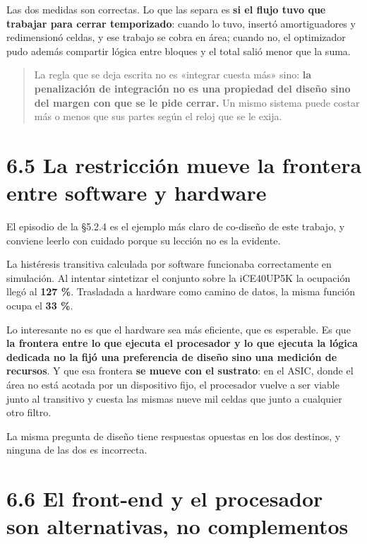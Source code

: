 Las dos medidas son correctas. Lo que las separa es \textbf{si el flujo
tuvo que trabajar para cerrar temporizado}: cuando lo tuvo, insertó
amortiguadores y redimensionó celdas, y ese trabajo se cobra en área;
cuando no, el optimizador pudo además compartir lógica entre bloques y
el total salió menor que la suma.

\begin{quote}
La regla que se deja escrita no es «integrar cuesta más» sino:
\textbf{la penalización de integración no es una propiedad del diseño
sino del margen con que se le pide cerrar.} Un mismo sistema puede
costar más o menos que sus partes según el reloj que se le exija.
\end{quote}

\section{6.5 La restricción mueve la frontera entre software y
hardware}\label{la-restricciuxf3n-mueve-la-frontera-entre-software-y-hardware}

El episodio de la §5.2.4 es el ejemplo más claro de co-diseño de este
trabajo, y conviene leerlo con cuidado porque su lección no es la
evidente.

La histéresis transitiva calculada por software funcionaba correctamente
en simulación. Al intentar sintetizar el conjunto sobre la iCE40UP5K la
ocupación llegó al \textbf{127 \%}. Trasladada a hardware como camino de
datos, la misma función ocupa el \textbf{33 \%}.

Lo interesante no es que el hardware sea más eficiente, que es
esperable. Es que \textbf{la frontera entre lo que ejecuta el procesador
y lo que ejecuta la lógica dedicada no la fijó una preferencia de diseño
sino una medición de recursos}. Y que esa frontera \textbf{se mueve con
el sustrato}: en el ASIC, donde el área no está acotada por un
dispositivo fijo, el procesador vuelve a ser viable junto al transitivo
y cuesta las mismas nueve mil celdas que junto a cualquier otro filtro.

La misma pregunta de diseño tiene respuestas opuestas en los dos
destinos, y ninguna de las dos es incorrecta.

\section{6.6 El front-end y el procesador son alternativas, no
complementos}\label{el-front-end-y-el-procesador-son-alternativas-no-complementos}

